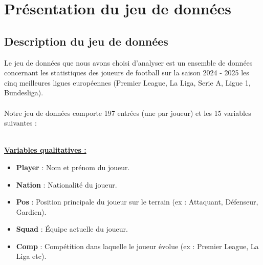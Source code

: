 \documentclass[11pt]{scrartcl}
\begin{document}

    \section{Présentation du jeu de données}

        \subsection{Description du jeu de données}
        Le jeu de données que nous avons choisi d'analyser est un ensemble de données concernant les statistiques des joueurs de football sur la saison 2024 - 2025 les cinq meilleures ligues européennes (Premier League, La Liga, Serie A, Ligue 1, Bundesliga).\\\\
        Notre jeu de données comporte 197 entrées (une par joueur) et les 15 variables suivantes :

        \textbf{\\\underline{Variables qualitatives :}\\}
            \begin{itemize}

                \item \textbf{Player} : Nom et prénom du joueur.
                \item \textbf{Nation} : Nationalité du joueur.
                \item \textbf{Pos} : Position principale du joueur sur le terrain (ex : Attaquant, Défenseur, Gardien).
                \item \textbf{Squad} : Équipe actuelle du joueur.
                \item \textbf{Comp} : Compétition dans laquelle le joueur évolue (ex : Premier League, La Liga etc).
                
            \end{itemize}
        
\end{document}
